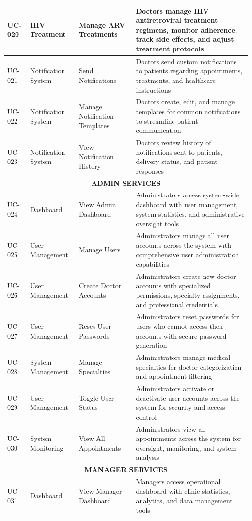 \documentclass[12pt,a4paper]{article}
\begin{document}
\begin{longtable}{|p{1cm}|p{3.5cm}|p{3.5cm}|p{6cm}|}
\hline
UC-020 & HIV Treatment & Manage ARV Treatments & Doctors manage HIV antiretroviral treatment regimens, monitor adherence, track side effects, and adjust treatment protocols \\
\hline
UC-021 & Notification System & Send Notifications & Doctors send custom notifications to patients regarding appointments, treatments, and healthcare instructions \\
\hline
UC-022 & Notification System & Manage Notification Templates & Doctors create, edit, and manage templates for common notifications to streamline patient communication \\
\hline
UC-023 & Notification System & View Notification History & Doctors review history of notifications sent to patients, delivery status, and patient responses \\
\hline
\multicolumn{4}{|c|}{\textbf{ADMIN SERVICES}} \\
\hline
UC-024 & Dashboard & View Admin Dashboard & Administrators access system-wide dashboard with user management, system statistics, and administrative oversight tools \\
\hline
UC-025 & User Management & Manage Users & Administrators manage all user accounts across the system with comprehensive user administration capabilities \\
\hline
UC-026 & User Management & Create Doctor Accounts & Administrators create new doctor accounts with specialized permissions, specialty assignments, and professional credentials \\
\hline
UC-027 & User Management & Reset User Passwords & Administrators reset passwords for users who cannot access their accounts with secure password generation \\
\hline
UC-028 & System Management & Manage Specialties & Administrators manage medical specialties for doctor categorization and appointment filtering \\
\hline
UC-029 & User Management & Toggle User Status & Administrators activate or deactivate user accounts across the system for security and access control \\
\hline
UC-030 & System Monitoring & View All Appointments & Administrators view all appointments across the system for oversight, monitoring, and system analysis \\
\hline
\multicolumn{4}{|c|}{\textbf{MANAGER SERVICES}} \\
\hline
UC-031 & Dashboard & View Manager Dashboard & Managers access operational dashboard with clinic statistics, analytics, and data management tools \\

\end{longtable}
\end{document}
